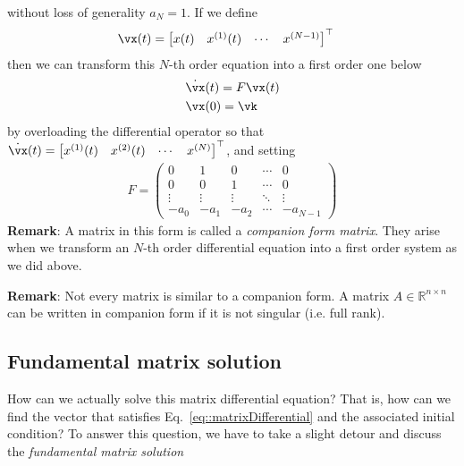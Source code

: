 \documentclass[a4paper,11pt]{exam}
\newcounter{ct}
\newcommand{\trp}{{^\top}} %
\newcommand{\field}[1]{\ensuremath{\mathbb{#1}}}
\newcommand{\reals}{\field{R}}
\begin{document}
\begin{questions}
without loss of generality $a_N = 1$.  If we define
\begin{align}
    \vx(t) &= \begin{bmatrix} x(t) & x^{(1)}(t) & \cdots & x^{(N-1)}\end{bmatrix}^\top
\end{align}
then we can transform this $N$-th order equation into a first order one below
\begin{align}\label{eq::matrixDifferential}
    &\dot{\vx}(t) = F \vx(t)\\
    &\vx(0) = \vk
\end{align}
by overloading the differential operator so that $\dot{\vx}(t) = \begin{bmatrix} x^{(1)}(t) & x^{(2)}(t) & \cdots & x^{(N)}\end{bmatrix}^\top
$, and setting
\begin{align}
    F = \begin{pmatrix} 0 & 1 & 0 & \cdots & 0 \\ 
                        0 & 0 & 1 & \cdots & 0 \\
                        \vdots & \vdots & \vdots & \ddots & \vdots\\
                        -a_0 & -a_1 & -a_2 & \cdots & -a_{N-1} \end{pmatrix}
\end{align}
\textbf{Remark}: A matrix in this form is called a \textit{companion form matrix}.
They arise when we transform an $N$-th order differential equation into a first order system as we did above.

\textbf{Remark}: Not every matrix is similar to a companion form. A matrix $A \in \reals^{n \times n}$ can be written in companion form if it is not singular (i.e. full rank).

\subsection{Fundamental matrix solution}
How can we actually solve this matrix differential equation? That is, how can we find the vector that satisfies Eq.~\eqref{eq::matrixDifferential} and the associated initial condition? To answer this question, we have to take a slight detour and discuss the \textit{fundamental matrix solution}


\end{questions}
\end{document}

